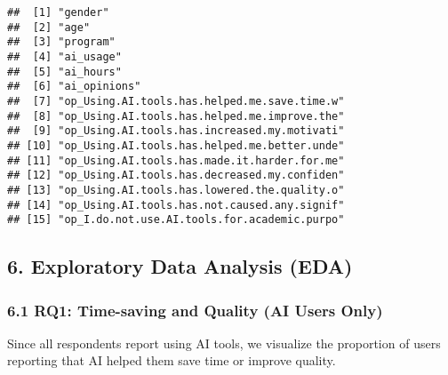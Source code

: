 \documentclass[
]{article}
\begin{document}
\begin{verbatim}
##  [1] "gender"                                     
##  [2] "age"                                        
##  [3] "program"                                    
##  [4] "ai_usage"                                   
##  [5] "ai_hours"                                   
##  [6] "ai_opinions"                                
##  [7] "op_Using.AI.tools.has.helped.me.save.time.w"
##  [8] "op_Using.AI.tools.has.helped.me.improve.the"
##  [9] "op_Using.AI.tools.has.increased.my.motivati"
## [10] "op_Using.AI.tools.has.helped.me.better.unde"
## [11] "op_Using.AI.tools.has.made.it.harder.for.me"
## [12] "op_Using.AI.tools.has.decreased.my.confiden"
## [13] "op_Using.AI.tools.has.lowered.the.quality.o"
## [14] "op_Using.AI.tools.has.not.caused.any.signif"
## [15] "op_I.do.not.use.AI.tools.for.academic.purpo"
\end{verbatim}

\subsection{6. Exploratory Data Analysis
(EDA)}\label{exploratory-data-analysis-eda}

\subsubsection{6.1 RQ1: Time-saving and Quality (AI Users
Only)}\label{rq1-time-saving-and-quality-ai-users-only}

Since all respondents report using AI tools, we visualize the proportion
of users reporting that AI helped them save time or improve quality.
\end{document}
